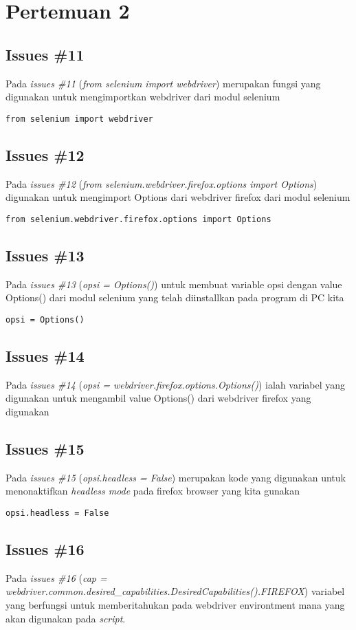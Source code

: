 \chapter{Pertemuan 2}

\section{Issues \#11}
Pada \textit{issues \#11} (\textit{from selenium import webdriver}) merupakan fungsi yang digunakan untuk mengimportkan webdriver dari modul selenium
\begin{verbatim}
from selenium import webdriver
\end{verbatim}
\section{Issues \#12}
Pada \textit{issues \#12} (\textit{from selenium.webdriver.firefox.options import Options}) 
digunakan untuk mengimport Options dari webdriver firefox dari modul selenium
\begin{verbatim}
from selenium.webdriver.firefox.options import Options
\end{verbatim}
\section{Issues \#13}
Pada \textit{issues \#13} (\textit{opsi = Options()}) 
untuk membuat variable opsi dengan value Options() dari modul selenium yang telah diinstallkan pada program di PC kita
\begin{verbatim}
opsi = Options()
\end{verbatim}
\section{Issues \#14}
Pada \textit{issues \#14} (\textit{opsi = webdriver.firefox.options.Options()}) ialah variabel yang digunakan untuk mengambil value Options() dari webdriver firefox yang digunakan
\section{Issues \#15}
Pada \textit{issues \#15} (\textit{opsi.headless = False}) merupakan kode yang digunakan untuk menonaktifkan \textit{headless mode} pada firefox browser yang kita gunakan
\begin{verbatim}
opsi.headless = False
\end{verbatim}
\section{Issues \#16}
Pada \textit{issues \#16} (\textit{cap = webdriver.common.desired\_capabilities.DesiredCapabilities().FIREFOX}) variabel yang berfungsi untuk memberitahukan pada webdriver environtment mana yang akan digunakan pada \textit{script}.
